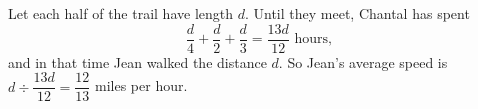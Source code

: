 Let each half of the trail have length $d$. Until they meet, Chantal has spent
\[\dfrac d4+\dfrac d2+\dfrac d3=\dfrac{13d}{12}\text{ hours},\]
and in that time Jean walked the distance $d$. So Jean's average speed is $d\div\dfrac{13d}{12}=\boxed{\dfrac{12}{13}}$ miles per hour.
